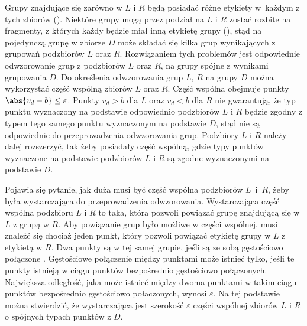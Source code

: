 Grupy znajdujące się zarówno w $ L $ i $ R $ będą posiadać różne etykiety \mbox{w każdym} z tych zbiorów (). Niektóre grupy mogą przez podział na $ L $ i $ R $ zostać rozbite na fragmenty, z których każdy będzie miał inną etykietę grupy (), stąd na pojedynczą grupę w zbiorze $ D $ może składać się kilka grup wynikających z grupowań podzbiorów $ L $ oraz $ R $. Rozwiązaniem tych problemów jest odpowiednie odwzorowanie grup z podzbiorów $ L $ oraz $ R $, na grupy spójne z wynikami grupowania $ D $. Do określenia odwzorowania grup $ L $, $ R $ na grupy $ D $ można wykorzystać część wspólną zbiorów $ L $ oraz $ R $. Część wspólna obejmuje punkty $ \abs{v_d - b} \le \varepsilon $. Punkty $ v_d > b $ dla $ L $ oraz $ v_d < b $ dla $ R $ nie gwarantują, że typ punktu wyznaczony na podstawie odpowiednio podzbiorów $ L $ i $ R $ będzie zgodny z typem tego samego punktu wyznaczonym na podstawie $ D $, stąd nie są odpowiednie do przeprowadzenia odwzorowania grup. Podzbiory $ L $ i $ R $ należy dalej rozszerzyć, tak żeby posiadały część wspólną, gdzie typy punktów wyznaczone na podstawie podzbiorów $ L $ i $ R $ są zgodne wyznaczonymi na podstawie $ D $.

Pojawia się pytanie, jak duża musi być część wspólna podzbiorów \mbox{$ L $ i $ R $}, żeby była wystarczająca do przeprowadzenia odwzorowania. Wystarczająca część wspólna podzbioru $ L $ i $ R $ to taka, która pozwoli powiązać grupę znajdującą się w $ L $ z grupą w $ R $. Aby powiązanie grup było możliwe w części wspólnej, musi znaleźć się chociaż jeden punkt, który pozwoli powiązać etykietę grupy w $ L $ z etykietą w $ R $. Dwa punkty są w tej samej grupie, jeśli są ze sobą gęstościowo połączone \cite{dbscan}. Gęstościowe połączenie między punktami może istnieć tylko, jeśli te punkty istnieją w ciągu punktów bezpośrednio gęstościowo połączonych. Największa odległość, jaka może istnieć między dwoma punktami w takim ciągu punktów bezpośrednio gęstościowo połaczonych, wynosi $ \varepsilon $. Na tej podstawie można stwierdzić, że wystarczająca jest szerokość $ \varepsilon $ części wspólnej zbiorów $ L $ i $ R $ o spójnych typach punktów z $ D $.\par

